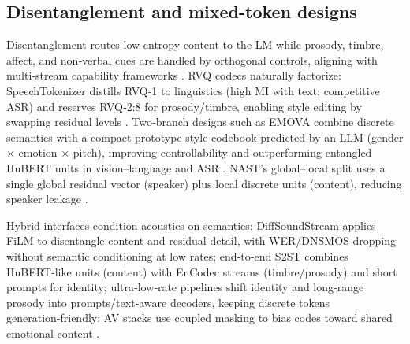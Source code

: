 \documentclass{article}
\begin{document}
\subsection{Disentanglement and mixed-token designs} \label{subsec:Disentanglement and mixed-token designs}
Disentanglement routes low‑entropy content to the LM while prosody, timbre, affect, and non‑verbal cues are handled by orthogonal controls, aligning with multi‑stream capability frameworks \cite{wang2025bossbeyondsemanticspeech,guo2025recentadvancesdiscretespeechtokensreview}. RVQ codecs naturally factorize: SpeechTokenizer distills RVQ‑1 to linguistics (high MI with text; competitive ASR) and reserves RVQ‑2:8 for prosody/timbre, enabling style editing by swapping residual levels \cite{zhang2024speechtokenizerunifiedspeechtokenizerlar}. Two‑branch designs such as EMOVA combine discrete semantics with a compact prototype style codebook predicted by an LLM (gender × emotion × pitch), improving controllability and outperforming entangled HuBERT units in vision–language and ASR \cite{chen2025emovaempoweringlanguagemodelsseehearspea}. NAST’s global–local split uses a single global residual vector (speaker) plus local discrete units (content), reducing speaker leakage \cite{messica2024nastnoiseawarespeechtokenizationlanguage}.

Hybrid interfaces condition acoustics on semantics: DiffSoundStream applies FiLM to disentangle content and residual detail, with WER/DNSMOS dropping without semantic conditioning at low rates; end‑to‑end S2ST combines HuBERT‑like units (content) with EnCodec streams (timbre/prosody) and short prompts for identity; ultra‑low‑rate pipelines shift identity and long‑range prosody into prompts/text‑aware decoders, keeping discrete tokens generation‑friendly; AV stacks use coupled masking to bias codes toward shared emotional content \cite{yang2025diffsoundstreamefficientspeechtokenizati,peng2024mslms2stmultitaskspeechlanguagemodeltext,wang2025tadicodectextawarediffusionspeechtokeniz,sadok2025vectorquantizedmaskedautoencoderaudiovis}.
\end{document}
